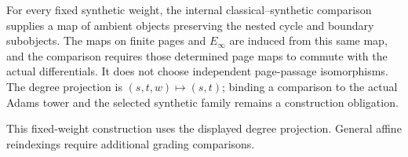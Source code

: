 

\begin{definition}
  \label{def:reindexed-ss-morphism}
  \leanok
  For every fixed synthetic weight, the internal classical--synthetic
  comparison supplies a map of ambient objects preserving the nested cycle
  and boundary subobjects.  The maps on finite pages and $E_\infty$ are
  induced from this same map, and the comparison requires those determined
  page maps to commute with the actual differentials.  It does not choose
  independent page-passage isomorphisms.  The degree projection is
  $(s,t,w)\mapsto(s,t)$; binding a comparison to the actual Adams tower and
  the selected synthetic family remains a construction obligation.

  This fixed-weight construction uses the displayed degree projection.
  General affine reindexings require additional grading comparisons.
\end{definition}

